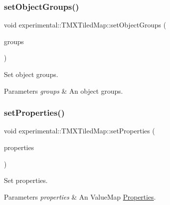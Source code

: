 \subsubsection{\texorpdfstring{set\+Object\+Groups()}{setObjectGroups()}\hspace{0.1cm}{\footnotesize\ttfamily [2/2]}}
{\footnotesize\ttfamily void experimental\+::\+T\+M\+X\+Tiled\+Map\+::set\+Object\+Groups (\begin{DoxyParamCaption}\item[{const \hyperlink{classVector}{Vector}$<$ \hyperlink{classTMXObjectGroup}{T\+M\+X\+Object\+Group} $\ast$$>$ \&}]{groups }\end{DoxyParamCaption})\hspace{0.3cm}{\ttfamily [inline]}}

Set object groups.


\begin{DoxyParams}{Parameters}
{\em groups} & An object groups. \\
\hline
\end{DoxyParams}
\mbox{\label{classexperimental_1_1TMXTiledMap_ab541c2f4c3ce22c25d2597152eb53833}} 
\subsubsection{\texorpdfstring{set\+Properties()}{setProperties()}\hspace{0.1cm}{\footnotesize\ttfamily [1/2]}}
{\footnotesize\ttfamily void experimental\+::\+T\+M\+X\+Tiled\+Map\+::set\+Properties (\begin{DoxyParamCaption}\item[{const Value\+Map \&}]{properties }\end{DoxyParamCaption})\hspace{0.3cm}{\ttfamily [inline]}}

Set properties.


\begin{DoxyParams}{Parameters}
{\em properties} & An Value\+Map \hyperlink{classProperties}{Properties}. \\
\hline
\end{DoxyParams}
\mbox{\label{classexperimental_1_1TMXTiledMap_ab541c2f4c3ce22c25d2597152eb53833}} 
